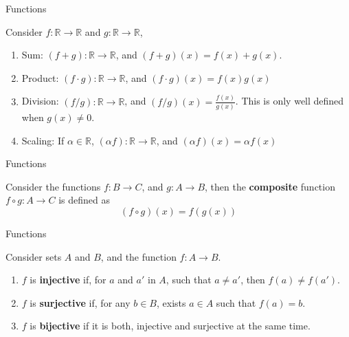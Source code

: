 \documentclass[aspectratio=169, handout]{beamer}
\begin{document}
\begin{frame}{Functions}
    
    \begin{definition}
        Consider $f:\mathds{R}\rightarrow\mathds{R}$ and $g:\mathds{R}\rightarrow\mathds{R}$,
        \begin{enumerate}
            \item Sum: $(f+g):\mathds{R}\rightarrow\mathds{R}$, and $(f+g)(x)=f(x)+g(x)$.
            \item Product: $(f\cdot g):\mathds{R}\rightarrow\mathds{R}$, and $(f\cdot g)(x)=f(x)g(x)$
            \item Division: $(f/g):\mathds{R}\rightarrow\mathds{R}$, and $(f/g)(x)=\frac{f(x)}{g(x)}$. This is only well defined when $g(x)\neq 0$.
            \item Scaling: If $\alpha\in\mathds{R}$, $(\alpha f):\mathds{R}\rightarrow\mathds{R}$, and $(\alpha f)(x)=\alpha f(x)$
        \end{enumerate}
    \end{definition}
    
\end{frame}

\begin{frame}{Functions}
    \begin{definition}
        Consider the functions $f:B\rightarrow C$, and $g:A\rightarrow B$, then the \textbf{composite} function $f \circ g:A\rightarrow C$ is defined as
        $$(f\circ g)(x) = f(g(x))$$
    \end{definition}
\end{frame}

\begin{frame}{Functions}
    \begin{definition}
        Consider sets $A$ and $B$, and the function $f:A\rightarrow B$.
        \begin{enumerate}
            \item $f$ is \textbf{injective} if, for $a$ and $a'$ in $A$, such that $a\neq a'$, then $f(a)\neq f(a')$.
            \item $f$ is \textbf{surjective} if, for any $b\in B$, exists $a\in A$ such that $f(a)=b$.
            \item $f$ is \textbf{bijective} if it is both, injective and surjective at the same time.
        \end{enumerate}
    \end{definition}
\end{frame}
\end{document}
